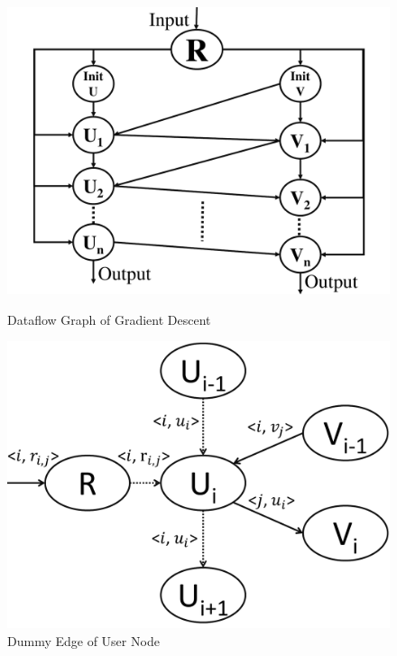 \documentclass{llncs}
\begin{document}
\begin{figure}[h]
\begin{minipage}[t]{0.45\linewidth}
\centering
\includegraphics[width=\textwidth]{pics/gdGraph.pdf}
\caption{Dataflow Graph of Gradient Descent \label{fig:gdGraph}}
\end{minipage}
\hfill
\begin{minipage}[t]{0.45\linewidth}
\centering
\includegraphics[width=\textwidth]{pics/dummyEdge.pdf}
\caption{Dummy Edge of User Node \label{fig:dummyEdge}}
\end{minipage}
\vspace{-20pt}
\end{figure}

\end{document}
